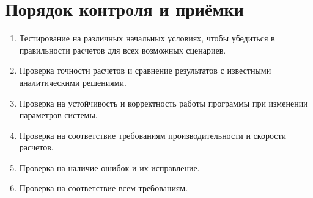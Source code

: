  \section{Порядок контроля и приёмки}
 \begin{enumerate}
  \item Тестирование на различных начальных условиях, чтобы убедиться в правильности расчетов для всех возможных сценариев.
  \item Проверка точности расчетов и сравнение результатов с известными аналитическими решениями.
  \item Проверка на устойчивость и корректность работы программы при изменении параметров системы.
  \item Проверка на соответствие требованиям производительности и скорости расчетов.
  \item Проверка на наличие ошибок и их исправление.
  \item Проверка на соответствие всем требованиям.
 \end{enumerate}

